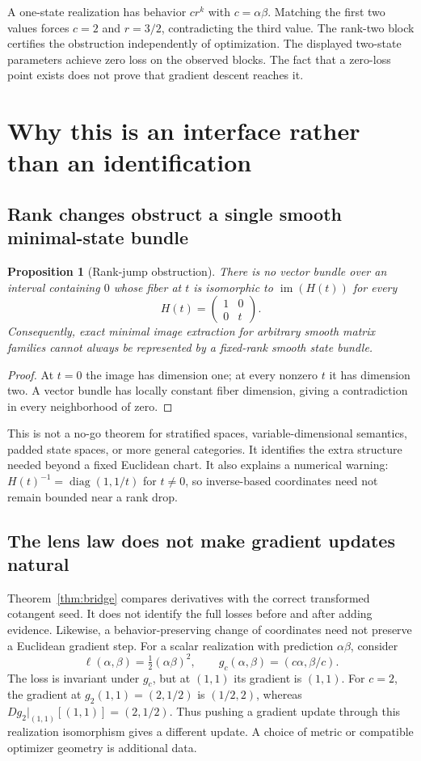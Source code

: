 \documentclass[11pt]{article}
\newtheorem{proposition}[theorem]{Proposition}
\theoremstyle{definition}
\newcommand{\im}{\operatorname{im}}
\begin{document}
A one-state realization has behavior $cr^k$ with $c=\alpha\beta$.
Matching the first two values forces $c=2$ and $r=3/2$, contradicting the
third value. The rank-two block certifies the obstruction independently of
optimization. The displayed two-state parameters achieve zero loss on the
observed blocks. The fact that a zero-loss point exists does not prove that
gradient descent reaches it.

\section{Why this is an interface rather than an identification}

\subsection{Rank changes obstruct a single smooth minimal-state bundle}

\begin{proposition}[Rank-jump obstruction]\label{prop:rankjump}
There is no vector bundle over an interval containing $0$ whose fiber at $t$
is isomorphic to $\im(H(t))$ for every
\[
H(t)=\begin{pmatrix}1&0\\0&t\end{pmatrix}.
\]
Consequently, exact minimal image extraction for arbitrary smooth matrix
families cannot always be represented by a fixed-rank smooth state bundle.
\end{proposition}
\begin{proof}
At $t=0$ the image has dimension one; at every nonzero $t$ it has dimension
two. A vector bundle has locally constant fiber dimension, giving a
contradiction in every neighborhood of zero.
\end{proof}

This is not a no-go theorem for stratified spaces, variable-dimensional
semantics, padded state spaces, or more general categories. It identifies the
extra structure needed beyond a fixed Euclidean chart. It also explains a
numerical warning: $H(t)^{-1}=\operatorname{diag}(1,1/t)$ for $t\ne0$, so
inverse-based coordinates need not remain bounded near a rank drop.

\subsection{The lens law does not make gradient updates natural}

Theorem~\ref{thm:bridge} compares derivatives with the correct transformed
cotangent seed. It does not identify the full losses before and after adding
evidence. Likewise, a behavior-preserving change of coordinates need not
preserve a Euclidean gradient step. For a scalar realization with prediction
$\alpha\beta$, consider
\[
\ell(\alpha,\beta)=\tfrac12(\alpha\beta)^2,
\qquad g_c(\alpha,\beta)=(c\alpha,\beta/c).
\]
The loss is invariant under $g_c$, but at $(1,1)$ its gradient is $(1,1)$.
For $c=2$, the gradient at $g_2(1,1)=(2,1/2)$ is $(1/2,2)$, whereas
$Dg_2|_{(1,1)}[(1,1)]=(2,1/2)$. Thus pushing a gradient update through this realization
isomorphism gives a different update. A choice of metric or compatible
optimizer geometry is additional data.
\end{document}
